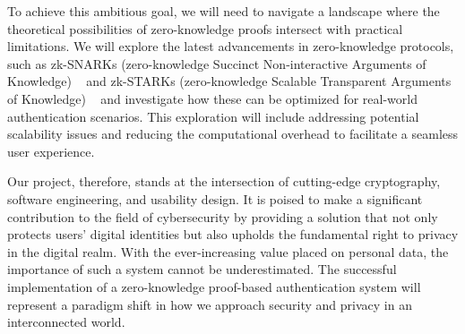 To achieve this ambitious goal, we will need to navigate a landscape where the theoretical possibilities of zero-knowledge proofs intersect with practical limitations. We will explore the latest advancements in zero-knowledge protocols, such as zk-SNARKs (zero-knowledge Succinct Non-interactive Arguments of Knowledge) ~\cite{petkus2019zksnark,chen2023reviewzksnark} and zk-STARKs (zero-knowledge Scalable Transparent Arguments of Knowledge) ~\cite{berentsen2022walkthroughzkstark,cryptoeprint2018zkstark} and investigate how these can be optimized for real-world authentication scenarios. This exploration will include addressing potential scalability issues and reducing the computational overhead to facilitate a seamless user experience.

Our project, therefore, stands at the intersection of cutting-edge cryptography, software engineering, and usability design. It is poised to make a significant contribution to the field of cybersecurity by providing a solution that not only protects users' digital identities but also upholds the fundamental right to privacy in the digital realm. With the ever-increasing value placed on personal data, the importance of such a system cannot be underestimated. The successful implementation of a zero-knowledge proof-based authentication system will represent a paradigm shift in how we approach security and privacy in an interconnected world.
